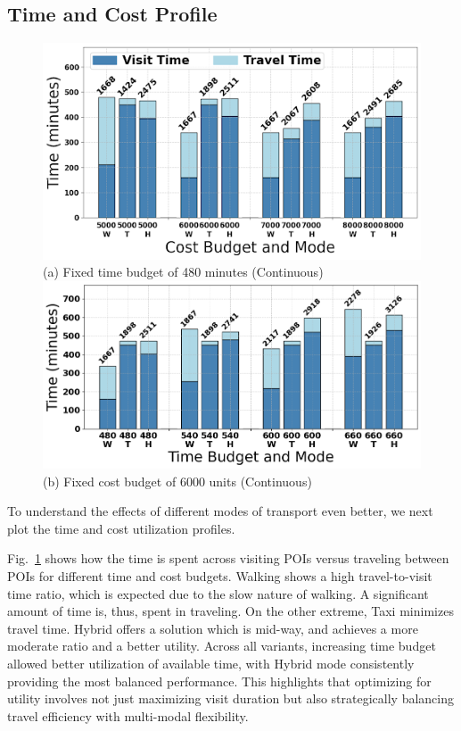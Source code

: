 \subsection{Time and Cost Profile}

\begin{figure}[t]
\centering
\includegraphics[width=\figwidth]{plots/tu1.png} \\
(a) Fixed time budget of 480 minutes (Continuous)
\includegraphics[width=\figwidth]{plots/tu2.png} \\
(b) Fixed cost budget of 6000 units (Continuous)
\label{fig:time-utilization}
\end{figure}

To understand the effects of different modes of transport even better, we next plot the time and cost utilization profiles.

Fig.~\ref{fig:time-utilization} shows how the time is spent across visiting POIs versus traveling between POIs for different time and cost budgets.
Walking shows a high travel-to-visit time ratio, which is expected due to the slow nature of walking. A significant amount of time is, thus, spent in traveling. On the other extreme, Taxi minimizes travel time. Hybrid offers a solution which is mid-way, and achieves a more moderate ratio and a better utility.
Across all variants, increasing time budget allowed better utilization of available time, with Hybrid mode consistently providing the most balanced performance. This highlights that optimizing for utility involves not just maximizing visit duration but also strategically balancing travel efficiency with multi-modal flexibility.

